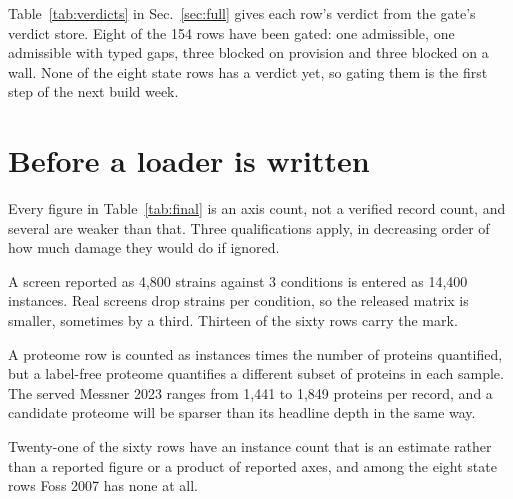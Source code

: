 Table~\ref{tab:verdicts} in Sec.~\ref{sec:full} gives each row's verdict from the gate's
verdict store. Eight of the 154 rows have been gated: one admissible, one admissible with
typed gaps, three blocked on provision and three blocked on a wall. None of the eight
state rows has a verdict yet, so gating them is the first step of the next build week.

\section{Before a loader is written}\label{sec:caveats}

Every figure in Table~\ref{tab:final} is an axis count, not a verified record count,
and several are weaker than that. Three qualifications apply, in decreasing order of how
much damage they would do if ignored.

 A screen reported as
4,800 strains against 3 conditions is entered as 14,400 instances. Real screens drop
strains per condition, so the released matrix is smaller, sometimes by a third. Thirteen of
the sixty rows carry the mark.

 A proteome row is counted as instances times
the number of proteins quantified, but a label-free proteome quantifies a different subset
of proteins in each sample. The served Messner 2023 ranges from 1,441 to 1,849 proteins per
record, and a candidate proteome will be sparser than its headline depth in the same way.

 Twenty-one of the sixty rows
have an instance count that is an estimate rather than a reported figure or a product of
reported axes, and among the eight state rows Foss 2007 has none at all.
